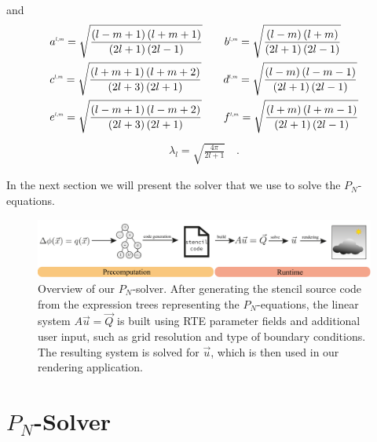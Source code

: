 \documentclass{egpubl}
\newcommand{\icaption}[1]{\caption{#1}}
\newcommand{\nocontentsline}[3]{}
\newcommand{\tocless}[2]{\bgroup\let\addcontentsline=\nocontentsline#1{#2}\egroup}
\begin{document}
and
\begin{align*}
&
a^{\scaleto{l,m}{4pt}}= \sqrt{\frac{\left(l-m+1\right)\left(l+m+1\right)}{\left(2l+1\right)\left(2l-1\right)}} \qquad
b^{\scaleto{l,m}{4pt}}= \sqrt{\frac{\left(l-m\right)\left(l+m\right)}{\left(2l+1\right)\left(2l-1\right)}}
\\&
c^{\scaleto{l,m}{4pt}}= \sqrt{\frac{\left(l+m+1\right)\left(l+m+2\right)}{\left(2l+3\right)\left(2l+1\right)}} \qquad
d^{\scaleto{l,m}{4pt}}= \sqrt{\frac{\left(l-m\right)\left(l-m-1\right)}{\left(2l+1\right)\left(2l-1\right)}}
\\&
e^{\scaleto{l,m}{4pt}}= \sqrt{\frac{\left(l-m+1\right)\left(l-m+2\right)}{\left(2l+3\right)\left(2l+1\right)}} \qquad
f^{\scaleto{l,m}{4pt}}= \sqrt{\frac{\left(l+m\right)\left(l+m-1\right)}{\left(2l+1\right)\left(2l-1\right)}}
\end{align*}
\begin{align*}
\lambda_l=\sqrt{\frac{4\pi}{2l+1}}
\quad .
\end{align*}

In the next section we will present the solver that we use to solve the $P_N$-equations.
\vspace{1in}

\begin{figure}[t!]
\centering
\includegraphics[width=\textwidth]{fig_pipeline_small.pdf}
\vspace{-0.2in}
\icaption{Overview of our $P_N$-solver. After generating the stencil source code from the expression trees representing the $P_N$-equations, the linear system $A\vec{u}=\vec{Q}$ is built using RTE parameter fields and additional user input, such as grid resolution and type of boundary conditions. The resulting system is solved for $\vec{u}$, which is then used in our rendering application.}
\label{fig:pnsolver}
\end{figure}

\vspace{-0.75in}

\tocless\section{$P_N$-Solver \label{sec:pnsolver}}
\end{document}
